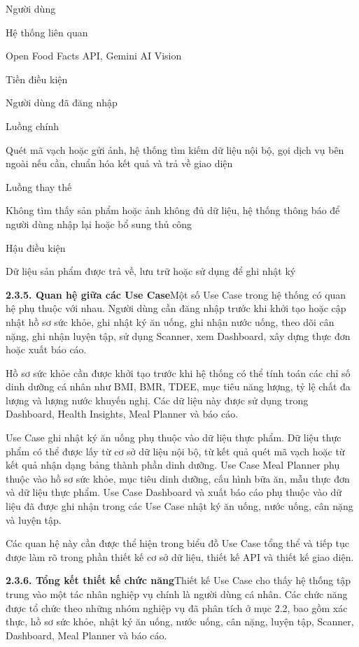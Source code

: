 Người dùng

Hệ thống liên quan

Open Food Facts API, Gemini AI Vision

Tiền điều kiện

Người dùng đã đăng nhập

Luồng chính

Quét mã vạch hoặc gửi ảnh, hệ thống tìm kiếm dữ liệu nội bộ, gọi dịch vụ bên ngoài nếu cần, chuẩn hóa kết quả và trả về giao diện

Luồng thay thế

Không tìm thấy sản phẩm hoặc ảnh không đủ dữ liệu, hệ thống thông báo để người dùng nhập lại hoặc bổ sung thủ công

Hậu điều kiện

Dữ liệu sản phẩm được trả về, lưu trữ hoặc sử dụng để ghi nhật ký

\textbf{2.3.5. Quan hệ giữa các Use Case}Một số Use Case trong hệ thống có quan hệ phụ thuộc với nhau. Người dùng cần đăng nhập trước khi khởi tạo hoặc cập nhật hồ sơ sức khỏe, ghi nhật ký ăn uống, ghi nhận nước uống, theo dõi cân nặng, ghi nhận luyện tập, sử dụng Scanner, xem Dashboard, xây dựng thực đơn hoặc xuất báo cáo.

Hồ sơ sức khỏe cần được khởi tạo trước khi hệ thống có thể tính toán các chỉ số dinh dưỡng cá nhân như BMI, BMR, TDEE, mục tiêu năng lượng, tỷ lệ chất đa lượng và lượng nước khuyến nghị. Các dữ liệu này được sử dụng trong Dashboard, Health Insights, Meal Planner và báo cáo.

Use Case ghi nhật ký ăn uống phụ thuộc vào dữ liệu thực phẩm. Dữ liệu thực phẩm có thể được lấy từ cơ sở dữ liệu nội bộ, từ kết quả quét mã vạch hoặc từ kết quả nhận dạng bảng thành phần dinh dưỡng. Use Case Meal Planner phụ thuộc vào hồ sơ sức khỏe, mục tiêu dinh dưỡng, cấu hình bữa ăn, mẫu thực đơn và dữ liệu thực phẩm. Use Case Dashboard và xuất báo cáo phụ thuộc vào dữ liệu đã được ghi nhận trong các Use Case nhật ký ăn uống, nước uống, cân nặng và luyện tập.

Các quan hệ này cần được thể hiện trong biểu đồ Use Case tổng thể và tiếp tục được làm rõ trong phần thiết kế cơ sở dữ liệu, thiết kế API và thiết kế giao diện.

\textbf{2.3.6. Tổng kết thiết kế chức năng}Thiết kế Use Case cho thấy hệ thống tập trung vào một tác nhân nghiệp vụ chính là người dùng cá nhân. Các chức năng được tổ chức theo những nhóm nghiệp vụ đã phân tích ở mục 2.2, bao gồm xác thực, hồ sơ sức khỏe, nhật ký ăn uống, nước uống, cân nặng, luyện tập, Scanner, Dashboard, Meal Planner và báo cáo.

